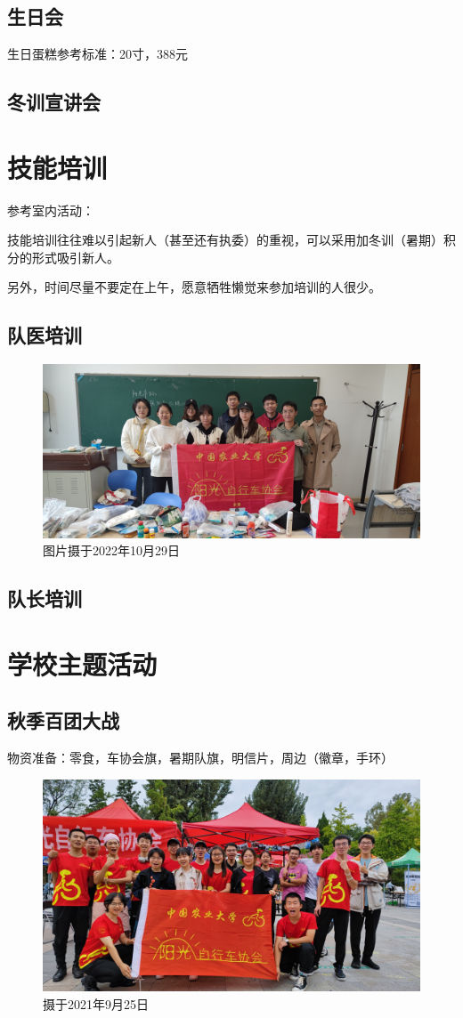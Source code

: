 \documentclass{ctexbook}
\begin{document}
\subsection{生日会}
生日蛋糕参考标准：20寸，388元

\subsection{冬训宣讲会}

\section{技能培训}
参考室内活动：

技能培训往往难以引起新人（甚至还有执委）的重视，可以采用加冬训（暑期）积分的形式吸引新人。

另外，时间尽量不要定在上午，愿意牺牲懒觉来参加培训的人很少。
\subsection{队医培训}
\begin{figure}[htp]
    \centering
    \includegraphics[width=0.7\linewidth]{fig/队医培训}
    \caption{图片摄于2022年10月29日}
    \label{fig:}
\end{figure}

\subsection{队长培训}

\section{学校主题活动}
\subsection{秋季百团大战}
物资准备：零食，车协会旗，暑期队旗，明信片，周边（徽章，手环）
\begin{figure}[H]
    \centering
    \includegraphics[width=0.7\linewidth]{fig/百团大战}
    \caption{摄于2021年9月25日}
    \label{fig:百团大战}
\end{figure}
\end{document}
